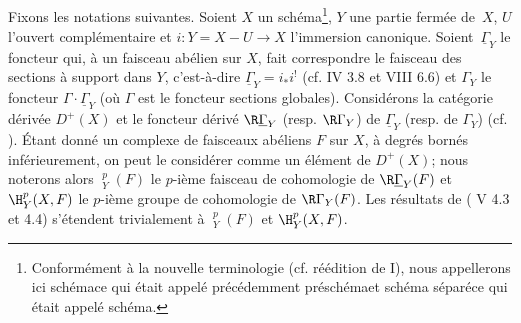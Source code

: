\subsection{}\label{XIV.1.0}
Fixons les notations suivantes. Soient $X$ un sch\'ema\footnote{Conform\'ement \`a la nouvelle terminologie (cf. r\'e\'edition de \EGA I), nous appellerons ici \og sch\'ema\fg ce qui \'etait appel\'e pr\'ec\'edemment \og pr\'esch\'ema\fg et \og sch\'ema s\'epar\'e\fg ce qui \'etait appel\'e \og sch\'ema\fg.}, $Y$ une partie ferm\'ee de~$X$, $U$ l'ouvert compl\'ementaire et $i:Y=X-U\to X$ l'immersion canonique. Soient~$\underline{\Gamma}_Y$ le foncteur qui, \`a un faisceau ab\'elien sur $X$, fait correspondre le \og faisceau des sections \`a support dans $Y$\fg, c'est-\`a-dire $\underline{\Gamma}_Y=i_*i^!$ (cf.  IV 3.8 et VIII 6.6) et $\Gamma_Y$ le foncteur $\Gamma\cdot \underline{\Gamma}_Y$ (o\`u $\Gamma$ est le foncteur \og sections globales{\fg}). Consid\'erons la cat\'egorie d\'eriv\'ee $D^+(X)$ et le foncteur d\'eriv\'e $\R\underline{\Gamma}_Y$ (resp. $\R\Gamma_Y$) de $\underline{\Gamma}_Y$ (resp. de $\Gamma_Y$) (cf. \cite{XIV.3}). \'Etant donn\'e un complexe de faisceaux ab\'eliens $F$ sur $X$, \`a degr\'es born\'es inf\'erieurement, on peut le consid\'erer comme un \'el\'ement de $D^+(X)$; nous noterons alors ${\mathop{\underline{\mathrm{H}}}\nolimits}_Y^p(F)$ le $p$-i\`eme faisceau de cohomologie de $\R\underline{\Gamma}_Y(F)$ et $\H_Y^p(X, F)$ le $p$-i\`eme groupe de cohomologie de $\R\Gamma_Y(F)$. Les r\'esultats de ( V 4.3 et 4.4) s'\'etendent trivialement \`a ${\mathop{\underline{\mathrm{H}}}\nolimits}_Y^p(F)$ et $\H_Y^p(X, F)$.

